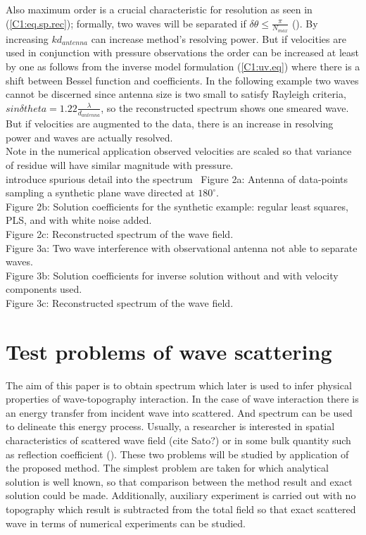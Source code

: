 Also maximum order is a crucial characteristic for resolution as seen in (\eqref{C1:eq.sp.rec});
formally, two waves will be separated if $\delta \theta \leq \frac{\pi}{N_{max}}$ 
(\cite{rafaely2004plane}). By increasing $k d_{antenna}$ can increase method's resolving power. But 
if velocities are used in conjunction with pressure observations the order can 
be increased at least by one as follows 
from the inverse model formulation (\ref{C1:uv.eq}) where there is a shift between Bessel function 
and coefficients. In the following example two waves cannot be discerned since antenna size is two 
small to satisfy Rayleigh criteria, $ sin \delta theta = 1.22 \frac{\lambda}{d_{antenna}} $, so the 
reconstructed spectrum shows one smeared wave. But if velocities are augmented to the data, there 
is an increase in resolving power and waves are actually resolved.\\
Note in the numerical application observed velocities are scaled so that variance of 
residue will have similar magnitude with pressure. \\

introduce spurious detail into the spectrum
\
Figure 2a: Antenna of data-points sampling a synthetic plane wave directed at $180^{\circ}$.\\
Figure 2b: Solution coefficients for the synthetic example: regular least squares, PLS, and with 
white noise added.\\
Figure 2c: Reconstructed spectrum of the wave field.\\

Figure 3a: Two wave interference with observational antenna not able to separate waves.\\
Figure 3b: Solution coefficients for inverse solution without and with velocity components used.\\
Figure 3c: Reconstructed spectrum of the wave field.\\

\section{Test problems of wave scattering}
The aim of this paper is to obtain spectrum which later is used to infer physical properties of 
wave-topography interaction. In the case of wave interaction there is an energy transfer from 
incident wave into scattered. And spectrum can be used to delineate this energy process. Usually, a 
researcher is interested in spatial characteristics of scattered wave field (cite Sato?) or in some 
bulk quantity such as reflection coefficient (\cite{klymak2016reflection}). These two problems will 
be studied by application of the proposed method. The simplest problem are taken for which 
analytical solution is well known, so that comparison between the method result and exact solution 
could be made. Additionally, auxiliary experiment is carried out with no topography which result is 
subtracted from the total field so that exact scattered wave in terms of numerical experiments can 
be studied.


